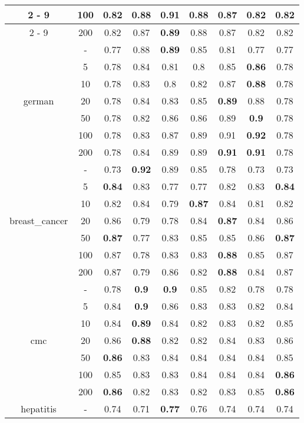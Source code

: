 \documentclass{article}%
\begin{document}
\begin{longtable}{c|c|ccccccc}
\cline{2%
-%
9}%
&100&0.82&0.88&\textbf{0.91}&0.88&0.87&0.82&0.82\\%
\cline{2%
-%
9}%
&200&0.82&0.87&\textbf{0.89}&0.88&0.87&0.82&0.82\\%
\hline%
\multirow{7}{*}{german}&{-}&0.77&0.88&\textbf{0.89}&0.85&0.81&0.77&0.77\\%
\cline{2%
-%
9}%
&5&0.78&0.84&0.81&0.8&0.85&\textbf{0.86}&0.78\\%
\cline{2%
-%
9}%
&10&0.78&0.83&0.8&0.82&0.87&\textbf{0.88}&0.78\\%
\cline{2%
-%
9}%
&20&0.78&0.84&0.83&0.85&\textbf{0.89}&0.88&0.78\\%
\cline{2%
-%
9}%
&50&0.78&0.82&0.86&0.86&0.89&\textbf{0.9}&0.78\\%
\cline{2%
-%
9}%
&100&0.78&0.83&0.87&0.89&0.91&\textbf{0.92}&0.78\\%
\cline{2%
-%
9}%
&200&0.78&0.84&0.89&0.89&\textbf{0.91}&\textbf{0.91}&0.78\\%
\hline%
\multirow{7}{*}{breast\_cancer}&{-}&0.73&\textbf{0.92}&0.89&0.85&0.78&0.73&0.73\\%
\cline{2%
-%
9}%
&5&\textbf{0.84}&0.83&0.77&0.77&0.82&0.83&\textbf{0.84}\\%
\cline{2%
-%
9}%
&10&0.82&0.84&0.79&\textbf{0.87}&0.84&0.81&0.82\\%
\cline{2%
-%
9}%
&20&0.86&0.79&0.78&0.84&\textbf{0.87}&0.84&0.86\\%
\cline{2%
-%
9}%
&50&\textbf{0.87}&0.77&0.83&0.85&0.85&0.86&\textbf{0.87}\\%
\cline{2%
-%
9}%
&100&0.87&0.78&0.83&0.83&\textbf{0.88}&0.85&0.87\\%
\cline{2%
-%
9}%
&200&0.87&0.79&0.86&0.82&\textbf{0.88}&0.84&0.87\\%
\hline%
\multirow{7}{*}{cmc}&{-}&0.78&\textbf{0.9}&\textbf{0.9}&0.85&0.82&0.78&0.78\\%
\cline{2%
-%
9}%
&5&0.84&\textbf{0.9}&0.86&0.83&0.83&0.82&0.84\\%
\cline{2%
-%
9}%
&10&0.84&\textbf{0.89}&0.84&0.82&0.83&0.82&0.85\\%
\cline{2%
-%
9}%
&20&0.86&\textbf{0.88}&0.82&0.82&0.84&0.83&0.86\\%
\cline{2%
-%
9}%
&50&\textbf{0.86}&0.83&0.84&0.84&0.84&0.84&0.85\\%
\cline{2%
-%
9}%
&100&0.85&0.83&0.83&0.84&0.84&0.84&\textbf{0.86}\\%
\cline{2%
-%
9}%
&200&\textbf{0.86}&0.82&0.83&0.82&0.83&0.85&\textbf{0.86}\\%
\hline%
\multirow{7}{*}{hepatitis}&{-}&0.74&0.71&\textbf{0.77}&0.76&0.74&0.74&0.74\\%

\end{longtable}
\end{document}
